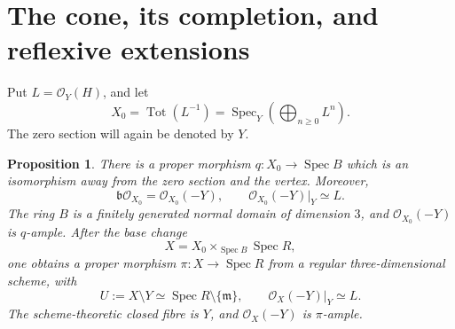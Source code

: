 \documentclass[11pt,reqno]{amsart}
\numberwithin{equation}{section}
\newtheorem{proposition}[theorem]{Proposition}
\theoremstyle{definition}
\theoremstyle{remark}
\newcommand{\OO}{\mathcal O}
\newcommand{\mm}{\mathfrak m}
\newcommand{\bb}{\mathfrak b}
\newcommand{\Spec}{\operatorname{Spec}}
\newcommand{\Tot}{\operatorname{Tot}}
\begin{document}
\section{The cone, its completion, and reflexive extensions}\label{sec:cone}

Put $L=\OO_Y(H)$, and let
\[
 X_0=\Tot(L^{-1})
     =\Spec_Y\!\left(\bigoplus_{n\geq0}L^n\right).
\]
The zero section will again be denoted by $Y$.

\begin{proposition}\label{prop:cone}
There is a proper morphism $q:X_0\to\Spec B$ which is an isomorphism
away from the zero section and the vertex. Moreover,
\begin{equation}\label{eq:conormal}
 \bb\OO_{X_0}=\OO_{X_0}(-Y),\qquad
 \OO_{X_0}(-Y)|_Y\simeq L.
\end{equation}
The ring $B$ is a finitely generated normal domain of dimension $3$,
and $\OO_{X_0}(-Y)$ is $q$-ample. After the base change
\[
 X=X_0\times_{\Spec B}\Spec R,
\]
one obtains a proper morphism $\pi:X\to\Spec R$ from a regular
three-dimensional scheme, with
\begin{equation}\label{eq:punctured}
 U:=X\setminus Y\simeq\Spec R\setminus\{\mm\},\qquad
 \OO_X(-Y)|_Y\simeq L.
\end{equation}
The scheme-theoretic closed fibre is $Y$, and $\OO_X(-Y)$ is
$\pi$-ample.
\end{proposition}
\end{document}
